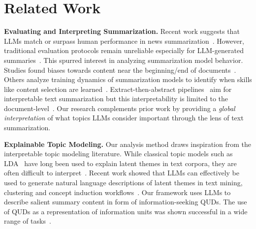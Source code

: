 \section{Related Work}
\textbf{Evaluating and Interpreting Summarization.}
Recent work suggests that LLMs match or surpass human performance in news summarization~\cite{Zhang:2024:TACL}.
However, traditional evaluation protocols remain unreliable especially for LLM-generated summaries~\cite{Fabbri:2021:TACL,Goyal:2023:arXiv}.
This spurred interest in analyzing summarization model behavior.
Studies found biases towards content near the beginning/end of documents~\cite{Ravaut:2024:ACL,Laban:2024:EMNLP}.
Others analyze training dynamics of summarization models to identify when skills like content selection are learned~\cite{Goyal:2022:ACL}.
Extract-then-abstract pipelines~\cite{Gehrmann:2018:EMNLP,Li:2021:ws} aim for interpretable text summarization but this interpretability is limited to the document-level~\cite{Dhaini:2024:INLG}.
Our research complements prior work by providing a \emph{global interpretation} of what topics LLMs consider important through the lens of text summarization.

\textbf{Explainable Topic Modeling.}
Our analysis method draws inspiration from the interpretable topic modeling literature.
While classical topic models such as LDA~\cite{Blei:2003:JMLR} have long been used to explain latent themes in text corpora, they are often difficult to interpret~\cite{Chang:2009:NeurIPS}.
Recent work showed that LLMs can effectively be used to generate natural language descriptions of latent themes in text mining, clustering and concept induction workflows~\cite{Pham:2024:NAACL,Zhong:2024:NeurIPS,Wang:2023:EMNLP,Lam:2024:CHI}.
Our framework uses LLMs to describe salient summary content in form of information-seeking QUDs.
The use of QUDs as a representation of information units was shown successful in a wide range of tasks~\cite{Newman:2023:EMNLP,Laban:2022:Findings,Trienes:2024:ACL,Wu:2023b:EMNLP}.
